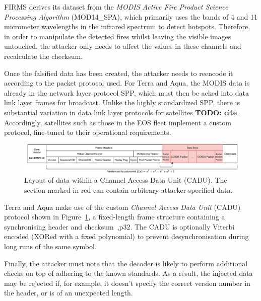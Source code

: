 FIRMS derives its dataset from the \textit{MODIS Active Fire Product Science Processing Algorithm} (MOD14\_SPA), which primarily uses the bands of 4 and 11 micrometer wavelengths in the infrared spectrum to detect hotspots.
Therefore, in order to manipulate the detected fires whilst leaving the visible images untouched, the attacker only needs to affect the values in these channels and recalculate the checksum.

Once the falsified data has been created, the attacker needs to reencode it according to the packet protocol used.
For Terra and Aqua, the MODIS data is already in the network layer protocol SPP, which must then be acked into data link layer frames for broadcast.
Unlike the highly standardized SPP, there is substantial variation in data link layer protocols for satellites \textbf{TODO: cite}.
Accordingly, satellites such as those in the EOS fleet implement a custom protocol, fine-tuned to their operational requirements.

\begin{figure}
    \centering
    \includegraphics[width=\textwidth]{diagrams/cadu_diagram.pdf}
    \caption{Layout of data within a Channel Access Data Unit (CADU). The section marked in red can contain arbitrary attacker-specified data.}
    \label{fig:cadu_diagram}
\end{figure}

Terra and Aqua make use of the custom \textit{Channel Access Data Unit} (CADU) protocol shown in Figure~\ref{fig:cadu_diagram}, a fixed-length frame structure containing a synchronising header and checksum~\cite{spaceGroundAqua},p32.
The CADU is optionally Viterbi encoded (XORed with a fixed polynomial) to prevent desynchronisation during long runs of the same symbol.

Finally, the attacker must note that the decoder is likely to perform additional checks on top of adhering to the known standards.
As a result, the injected data may be rejected if, for example, it doesn't specify the correct version number in the header, or is of an unexpected length.


